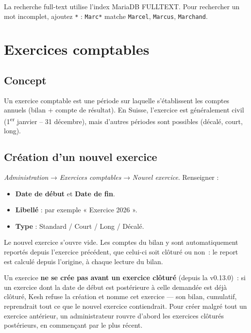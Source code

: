 \documentclass[a4paper,11pt,oneside]{article}
\begin{document}
\begin{keshtip}
La recherche full-text utilise l'index MariaDB FULLTEXT. Pour rechercher un mot incomplet, ajoutez \texttt{*} : \texttt{Marc*} matche \texttt{Marcel}, \texttt{Marcus}, \texttt{Marchand}.
\end{keshtip}

\section{Exercices comptables}

\subsection{Concept}

Un exercice comptable est une période sur laquelle s'établissent les comptes annuels (bilan + compte de résultat). En Suisse, l'exercice est généralement civil (1\textsuperscript{er} janvier -- 31 décembre), mais d'autres périodes sont possibles (décalé, court, long).

\subsection{Création d'un nouvel exercice}

\emph{Administration} → \emph{Exercices comptables} → \emph{Nouvel exercice}. Renseigner :

\begin{itemize}
    \item \textbf{Date de début} et \textbf{Date de fin}.
    \item \textbf{Libellé} : par exemple « Exercice 2026 ».
    \item \textbf{Type} : Standard / Court / Long / Décalé.
\end{itemize}

Le nouvel exercice s'ouvre vide. Les comptes du bilan y sont automatiquement reportés depuis l'exercice précédent, que celui-ci soit clôturé ou non~: le report est calculé depuis l'origine, à chaque lecture du bilan.

Un exercice \textbf{ne se crée pas avant un exercice clôturé} (depuis la v0.13.0)~: si un exercice dont la date de début est postérieure à celle demandée est déjà clôturé, Kesh refuse la création et nomme cet exercice --- son bilan, cumulatif, reprendrait tout ce que le nouvel exercice contiendrait. Pour créer malgré tout un exercice antérieur, un administrateur rouvre d'abord les exercices clôturés postérieurs, en commençant par le plus récent.
\end{document}

